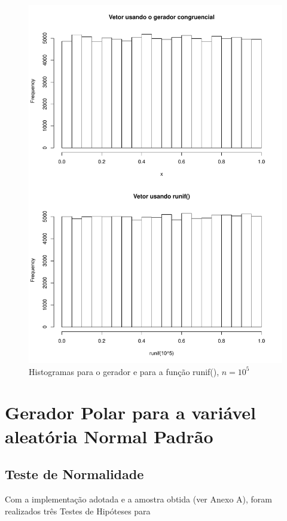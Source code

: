 \documentclass[
	article,			%
	12pt,				%
	twoside,			%
	a4paper,			%
	english,			%
	brazil,				%
	]{abntex2}
\begin{document}
    \begin{figure}[h]
        \centering
        \includegraphics[scale=0.55]{hist_runif_congruencial}
        \caption{Histogramas para o gerador e para a função runif(), $n = 10^5$}
        \label{fig:hist_runif}
    \end{figure}
    
    \newpage
    
\section{Gerador Polar para a variável aleatória Normal Padrão}\label{gerador:polar}
\subsection{Teste de Normalidade}\label{metodo:rnorm_polar}
    Com a implementação adotada e a amostra obtida (ver Anexo A), foram realizados três Testes de Hipóteses para 
        
\end{document}
